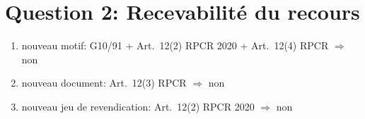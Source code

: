 \section{Question 2: Recevabilité du recours}

\begin{enumerate}
    \item nouveau motif: G10/91 + Art.~12(2) RPCR 2020
    + Art.~12(4) RPCR $\Rightarrow$ non
    \item nouveau document: Art.~12(3) RPCR
    $\Rightarrow$ non
    \item nouveau jeu de revendication: Art.~12(2)
    RPCR 2020 $\Rightarrow$ non
\end{enumerate}
